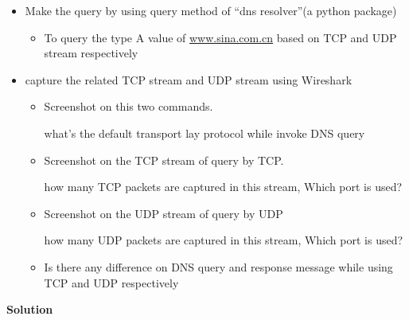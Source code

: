 \documentclass[12pt,letterpaper]{ctexart}
\begin{document}
\begin{itemize}
  \item Make the query by using query method of ``dns resolver''(a python package)
  \begin{itemize}
    \item To query the type A value of \href{www.sina.com.cn}{www.sina.com.cn} based on TCP and UDP stream respectively
  \end{itemize}
  \item capture the related TCP stream and UDP stream using Wireshark
  \begin{itemize}
    \item Screenshot on this two commands.

    what's the default transport lay protocol while invoke DNS query
    \item Screenshot on the TCP stream of query by TCP.

    how many TCP packets are captured in this stream, Which port is used?
    \item Screenshot on the UDP stream of query by UDP

    how many UDP packets are captured in this stream, Which port is used?
    \item Is there any difference on DNS query and response message while using TCP and UDP respectively
  \end{itemize}
\end{itemize}


{\bf Solution}
\end{document}
